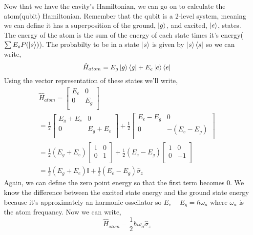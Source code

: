 \documentclass{article}
\numberwithin{equation}{section}
\begin{document}
Now that we have the cavity's Hamiltonian, we can go on to calculate the atom(qubit) Hamiltonian. \newline
Remember that the qubit is a 2-level system, meaning we can define it has a superposition of the ground, $\ket{g}$, and excited, $\ket{e}$, states. The energy of the atom is the sum of the energy of each state times it's energy($\sum E_sP(\ket{s})$). The probabilty to be in a state $\ket{s}$ is given by $\ket{s}\bra{s}$ so we can write,
\begin{equation}
    \hat{H}_{atom} = E_g\ket{g}\bra{g} + E_e\ket{e}\bra{e}
\end{equation}
Using the vector representation of these states we'll write,
\begin{equation}
    \begin{split}
        \hat{H}_{atom} =
        \begin{bmatrix}
        E_e & 0     \\
        0   & E_g   \\
        \end{bmatrix} \\
        = \frac{1}{2}\begin{bmatrix}
        E_g + E_e & 0          \\
        0         & E_g + E_e  \\
        \end{bmatrix} +
        \frac{1}{2}\begin{bmatrix}
        E_e - E_g & 0          \\
        0         & -(E_e - E_g)  \\
        \end{bmatrix} \\
        = \frac{1}{2}(E_g + E_e)\begin{bmatrix}
        1 & 0          \\
        0         & 1  \\
        \end{bmatrix} +
        \frac{1}{2}(E_e - E_g)\begin{bmatrix}
        1 & 0          \\
        0         & -1  \\
        \end{bmatrix} \\
        = \frac{1}{2}(E_g + E_e)\mathbb{I} + \frac{1}{2}(E_e - E_g)\hat{\sigma}_z
    \end{split}
\end{equation}
Again, we can define the zero point energy so that the first term becomes $0$. We know the difference between the excited state energy and the ground state energy because it's approximately an harmonic osscilator so $E_e - E_g = \hbar\omega_a$ where $\omega_a$ is the atom frequancy. Now we can write,
\begin{equation}
    \hat{H}_{atom} = \frac{1}{2}\hbar\omega_a\hat{\sigma}_z
\end{equation}
\end{document}
